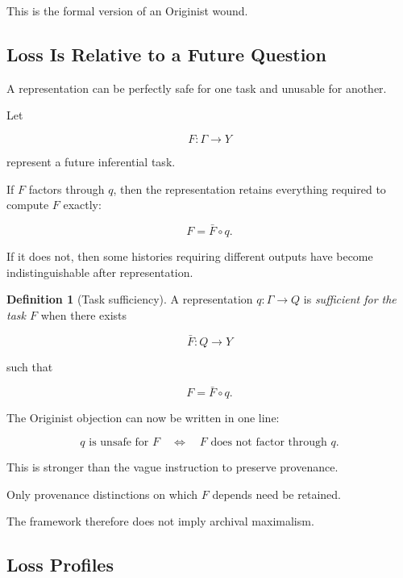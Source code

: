\documentclass[
  11pt,
  a4paper,
  DIV=12,
  BCOR=0mm,
  parskip=half-
]{scrartcl}
\theoremstyle{definition}
\newtheorem{definition}{Definition}[section]
\theoremstyle{plain}
\theoremstyle{remark}
\begin{document}
This is the formal version of an Originist wound.


\subsection{Loss Is Relative to a Future Question}
\label{app:task-relative-safety}

A representation can be perfectly safe for one task and unusable for another.

Let

\[
  F:\Gamma\to Y
\]

represent a future inferential task.

If \(F\) factors through \(q\), then the representation retains everything
required to compute \(F\) exactly:

\[
  F=\bar F\circ q.
\]

If it does not, then some histories requiring different outputs have become
indistinguishable after representation.

\begin{definition}[Task sufficiency]
\label{def:task-sufficiency}
A representation \(q:\Gamma\to Q\) is \emph{sufficient for the task \(F\)}
when there exists

\[
  \bar F:Q\to Y
\]

such that

\[
  F=\bar F\circ q.
\]
\end{definition}

The Originist objection can now be written in one line:

\[
  q\text{ is unsafe for }F
  \quad\Longleftrightarrow\quad
  F\text{ does not factor through }q.
\]

This is stronger than the vague instruction to preserve provenance.

Only provenance distinctions on which \(F\) depends need be retained.

The framework therefore does not imply archival maximalism.


\subsection{Loss Profiles}
\label{app:loss-profiles}
\end{document}
